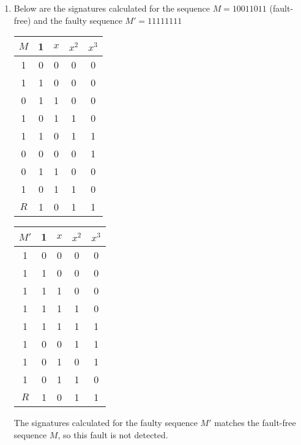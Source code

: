 \documentclass[a4paper,12pt]{article}
\begin{document}
\begin{enumerate}
        \item Below are the signatures calculated for the sequence $M = {10011011}$ (fault-free) and the faulty sequence $M' = {11111111}$

            \begin{tabular}{|c|c|c|c|c|}
                \hline
                $M$ & 1 & $x$ & $x^2$ & $x^3$ \\ \hline
                1   & 0 & 0   & 0     & 0     \\ \hline
                1   & 1 & 0   & 0     & 0     \\ \hline
                0   & 1 & 1   & 0     & 0     \\ \hline
                1   & 0 & 1   & 1     & 0     \\ \hline
                1   & 1 & 0   & 1     & 1     \\ \hline
                0   & 0 & 0   & 0     & 1     \\ \hline
                0   & 1 & 1   & 0     & 0     \\ \hline
                1   & 0 & 1   & 1     & 0     \\ \hline
                $R$ & 1 & 0   & 1     & 1     \\ \hline
            \end{tabular}
            \begin{tabular}{|c|c|c|c|c|}
                \hline
                $M'$ & 1 & $x$ & $x^2$ & $x^3$ \\ \hline
                1    & 0 & 0   & 0     & 0     \\ \hline
                1    & 1 & 0   & 0     & 0     \\ \hline
                1    & 1 & 1   & 0     & 0     \\ \hline
                1    & 1 & 1   & 1     & 0     \\ \hline
                1    & 1 & 1   & 1     & 1     \\ \hline
                1    & 0 & 0   & 1     & 1     \\ \hline
                1    & 0 & 1   & 0     & 1     \\ \hline
                1    & 0 & 1   & 1     & 0     \\ \hline
                $R$  & 1 & 0   & 1     & 1     \\ \hline
            \end{tabular}

            The signatures calculated for the faulty sequence $M'$ matches the fault-free sequence $M$, so this fault is not detected.

    \end{enumerate}
\end{document}
